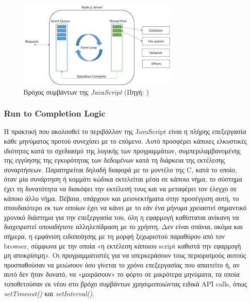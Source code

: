 \begin{figure}[ht]
	\includegraphics[scale=0.9]{figures/js-event-loop.png}
	\centering
	\caption{Βρόχος συμβάντων της \textit{JavaScript} (Πηγή: \cite{[JS3]})}
	\label{eventloop}
\end{figure}

\subsubsection{Run to Completion Logic}

Η πρακτική που ακολουθεί το περιβάλλον της JavaScript είναι η πλήρης
επεξεργασία κάθε μηνύματος προτού συνεχίσει με το επόμενο. Αυτό προσφέρει
κάποιες ελκυστικές ιδιότητες κατά το σχεδιασμό της λογικής των προγραμμάτων, συμπεριλαμβανομένης της εγγύησης της εγκυρότητας των δεδομένων κατά τη διάρκεια της εκτέλεσης συναρτήσεων. Παρατηρείται δηλαδή διαφορά με το μοντέλο της C, κατά το οποίο, όταν μία συνάρτηση ή κομμάτι κώδικα εκτελείται μέσα σε κάποιο νήμα, το σύστημα έχει τη δυνατότητα να διακόψει την εκτέλεσή τους και να μεταφέρει τον έλεγχο σε κάποιο άλλο νήμα. Βέβαια, υπάρχουν και μειονεκτήματα στην προσέγγιση αυτή, το σπουδαιότερο εκ των οποίων έχει να κάνει με το εάν ένα μήνυμα χρειαστεί σημαντικό χρονικό διάστημα για την επεξεργασία του, όλη η εφαρμογή καθίσταται ανίκανη να διαχειριστεί οποιαδήποτε αλληλεπίδραση με το χρήστη. Δεν είναι σπάνια, ακόμα και σήμερα, η εμφάνιση ειδοποίησης με τη μορφή ξεχωριστού παραθύρου από τον browser, σύμφωνα με την οποία «η εκτέλεση κάποιου script καθιστά την εφαρμογή μη αποκρίσιμη». Οι προγραμματιστές για να υπερκεράσουν τους περιορισμούς αυτούς προσπαθούσαν να μειώσουν όσο γίνεται το χρόνο επεξεργασίας που απαιτείτο ή, αν
αυτό δεν ήταν δυνατό, να «μοιράσουν» το φόρτο σε μικρότερα μηνύματα, τα οποία τοποθετούσαν εκ νέου στο βρόχο συμβάντων χρησιμοποιώντας ειδικά API calls, όπως \textit{setTimeout()} και \textit{setInterval()}.

